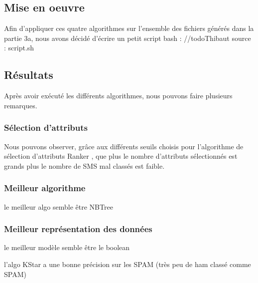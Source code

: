 \subsection{Mise en oeuvre}

Afin d'appliquer ces quatre algorithmes sur l'ensemble des fichiers générés dans la partie 3a, nous avons décidé d'écrire un petit script bash :
//todo{Thibaut} source : script.sh

\subsection{Résultats}

Après avoir exécuté les différents algorithmes, nous pouvons faire plusieurs remarques.

\subsubsection{Sélection d'attributs}
Nous pouvons observer, grâce aux différents seuils choisis pour l'algorithme de sélection d'attributs \og Ranker \fg{}, que plus le nombre d'attributs sélectionnés est grands plus le nombre de SMS mal classés est faible.

\subsubsection{Meilleur algorithme}
    le meilleur algo semble être NBTree

\subsubsection{Meilleur représentation des données}
    le meilleur modèle semble être le boolean 

    l'algo KStar a une bonne précision sur les SPAM (très peu de ham classé comme SPAM)



